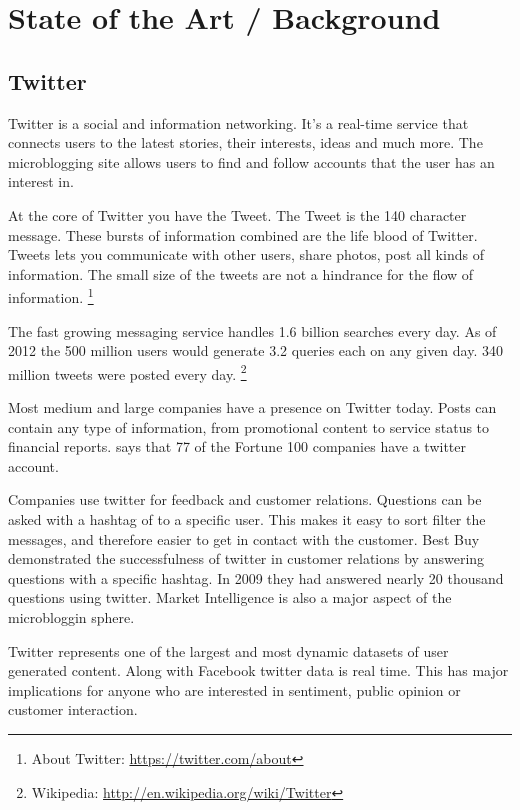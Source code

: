 \chapter{State of the Art / Background }

\section{Twitter}
Twitter is a social and information networking. It's a real-time service that
connects users to the latest stories, their interests, ideas and much more. The
microblogging site allows users to find and follow accounts that the user has
an interest in. 

At the core of Twitter you have the Tweet. The Tweet is the 140 character
message. These bursts of information combined are the life blood of Twitter.
Tweets lets you communicate with other users, share photos, post all kinds of
information. The small size of the tweets are not a hindrance for the flow of
information. 
\footnote{About Twitter: \url{https://twitter.com/about}}

The fast growing messaging service handles 1.6 billion searches every day.
As of 2012 the 500 million users would generate 3.2 queries each on any given
day. 340 million tweets were posted every day. 
\footnote{Wikipedia: \url{http://en.wikipedia.org/wiki/Twitter}} 

Most medium and large companies have a presence on Twitter today. Posts can contain
any type of information, from promotional content to service status to
financial reports. \cite[p8]{annikajubbega11:twitter_driver_stock_price} says
that 77 of the Fortune 100 companies have a twitter account. 

Companies use twitter for feedback and customer relations. Questions can be
asked with a hashtag of to a specific user. This makes it easy to sort filter
the messages, and therefore easier to get in contact with the customer. Best
Buy demonstrated the successfulness of twitter in customer relations by
answering questions with a specific hashtag. In 2009 they had answered nearly
20 thousand questions using twitter. \cite[p1]{Li2013206}
Market Intelligence is also a major aspect of the microbloggin sphere.

Twitter represents one of the largest and most dynamic datasets of user
generated content. Along with Facebook twitter data is real time. This has major
implications for anyone who are interested in sentiment, public opinion or
customer interaction. \cite[]{sperious11}

